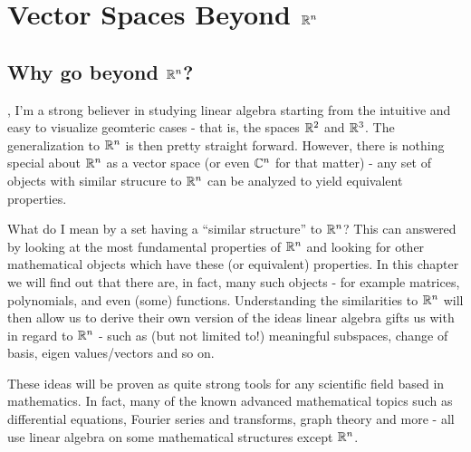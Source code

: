 \section{Vector Spaces Beyond $\Rs[n]$}
\subsection{Why go beyond $\Rs[n]$?}
, I'm a strong believer in studying linear algebra starting from the intuitive and easy to visualize geomteric cases - that is, the spaces $\Rs[2]$ and $\Rs[3]$. The generalization to $\Rs[n]$ is then pretty straight forward. However, there is nothing special about $\Rs[n]$ as a vector space (or even $\Cs[n]$ for that matter) - any set of objects with similar strucure to $\Rs[n]$ can be analyzed to yield equivalent properties.

What do I mean by a set having a \enquote{similar structure} to $\Rs[n]$? This can answered by looking at the most fundamental properties of $\Rs[n]$ and looking for other mathematical objects which have these (or equivalent) properties. In this chapter we will find out that there are, in fact, many such objects - for example matrices, polynomials, and even (some) functions. Understanding the similarities to $\Rs[n]$ will then allow us to derive their own version of the ideas linear algebra gifts us with in regard to $\Rs[n]$ - such as (but not limited to!) meaningful subspaces, change of basis, eigen values/vectors and so on.

These ideas will be proven as quite strong tools for any scientific field based in mathematics. In fact, many of the known advanced mathematical topics such as differential equations, Fourier series and transforms, graph theory and more - all use linear algebra on some mathematical structures except $\Rs[n]$.

